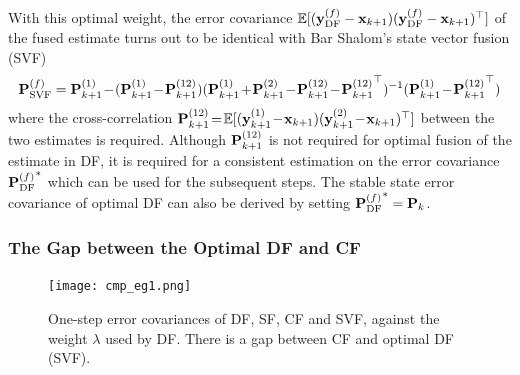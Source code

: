 With this optimal weight, the error covariance $\mathbb{E}[({{\bf y}^{(f)}_{\text{DF}}}-{\bf x}_{k+1})({{\bf y}^{(f)}_{\text{DF}}}-{\bf x}_{k+1})^\top]$ of the fused estimate turns out to be identical with Bar Shalom's state vector fusion (SVF) \cite{Bar-Shalom1986}
\begin{equation}
\begin{split}
{\bf P}^{(f)}_{\text{SVF}}&={\bf P}^{(1)}_{k+1}\!-\!({\bf P}^{(1)}_{k+1}\!-\!{\bf P}^{(12)}_{k+1})({\bf P}^{(1)}_{k+1}\!+\!{\bf P}^{(2)}_{k+1}\!-\!{\bf P}^{(12)}_{k+1}\!-\!{{\bf P}^{(12)}_{k+1}}^\top)^{-1}({\bf P}^{(1)}_{k+1}\!-\!{{\bf P}^{(12)}_{k+1}}^\top)\\
\end{split}
\end{equation}
where the cross-correlation ${\bf P}^{(12)}_{k+1}\!=\!\mathbb{E}[({{\bf y}^{(1)}_{k+1}}\!-\!{\bf x}_{k+1})({{\bf y}^{(2)}_{k+1}}\!-\!{\bf x}_{k+1})^\top]$ between the two estimates is required. Although ${\bf P}^{(12)}_{k+1}$ is not required for optimal fusion of the estimate in DF, it is required for a consistent estimation on the error covariance ${{\bf P}^{(f)}_{\text{DF}}}^*$ which can be used for the subsequent steps. The stable state error covariance of optimal DF can also be derived by setting ${{\bf P}^{(f)}_{\text{DF}}}^*={\bf P}_k$.

\subsubsection{The Gap between the Optimal DF and CF}

\begin{figure}[htbp]
\centering
\texttt{[image: cmp\_eg1.png]}
\caption{One-step error covariances of DF, SF, CF and SVF, against the weight $\lambda$ used by DF. There is a gap between CF and optimal DF (SVF).}
\label{cmp_eg1}
\end{figure}

